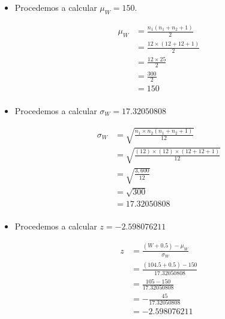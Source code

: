 \begin{enumerate}
\begin{itemize}
            \item Procedemos a calcular $\mu_W = 150$.
                \begin{center}
                   \begin{align*}
                       \mu_W &= \frac{n_1(n_1+n_2+1)}{2}\\
                       &= \frac{12\times(12 + 12 + 1)}{2} \\ 
                       &= \frac{12\times 25}{2} \\ 
                       &= \frac{300}{2} \\ 
                       &= 150 \\  
                   \end{align*}
                \end{center}

            \item Procedemos a calcular $\sigma_W = 17.32050808$
                \begin{center}
                   \begin{align*}
                       \sigma_W &= \sqrt{\frac{n_1\times n_2(n_1+n_2+1)}{12}} \\
                       &= \sqrt{\frac{(12)\times(12)\times(12+12+1)}{12}} \\
                       &= \sqrt{\frac{3,600}{12}} \\
                       &= \sqrt{300} \\
                       &= 17.32050808 \\
                   \end{align*}
                \end{center}
            
            \item Procedemos a calcular $z = -2.598076211$
                \begin{center}
                   \begin{align*}
                       z &= \frac{(W+0.5)-\mu_W}{\sigma_W} \\
                       &= \frac{(104.5+0.5)-150}{17.32050808} \\
                       &= \frac{105-150}{17.32050808} \\ 
                       &= -\frac{45}{17.32050808} \\
                       &= -2.598076211 \\ 
                   \end{align*}
                \end{center}
            

\end{itemize}
\end{enumerate}
